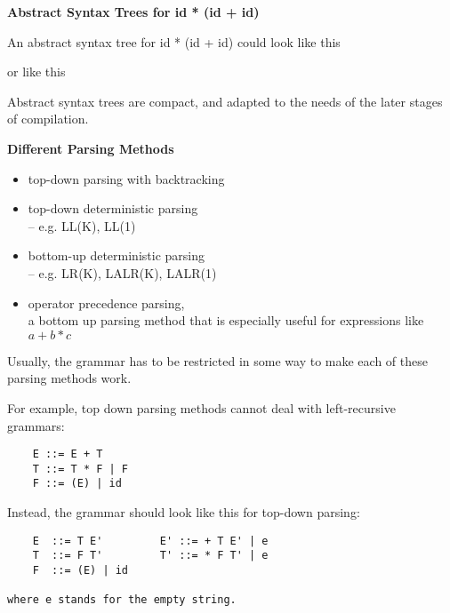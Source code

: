 %
%
\begin{slide}{}
{\bf Abstract Syntax Trees for id * (id + id)}

An abstract syntax tree for id * (id + id) could look like this

\vspace{3ex}

or like this

\vspace{3ex}

Abstract syntax trees are compact, and adapted to the needs of the later
stages of compilation.
\end{slide}
%
%
\begin{slide}{}
{\bf Different Parsing Methods}
\begin{itemize}
\item top-down parsing with backtracking
\item top-down deterministic parsing \\ -- e.g. LL(K), LL(1)
\item bottom-up deterministic parsing \\ -- e.g. LR(K), LALR(K), LALR(1)
\item operator precedence parsing,\\
      a bottom up parsing method that is especially useful for
     expressions like $ a+b*c $
\end{itemize}
Usually, the grammar has to be restricted in some way to make each of
these parsing methods work.
\end{slide}
%
%
\begin{slide}{}
For example, top down parsing methods cannot deal with left-recursive
grammars:
\begin{verbatim}
    E ::= E + T
    T ::= T * F | F
    F ::= (E) | id

\end{verbatim}
Instead, the grammar should look like this for top-down parsing:
\begin{verbatim}
    E  ::= T E'         E' ::= + T E' | e
    T  ::= F T'         T' ::= * F T' | e
    F  ::= (E) | id

where e stands for the empty string.
\end{verbatim}
\end{slide}

